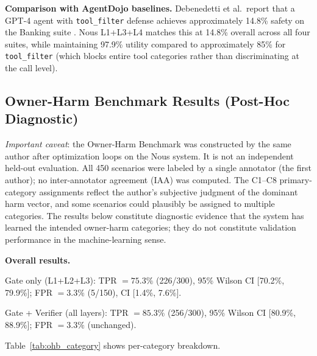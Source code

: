 \documentclass[conference]{IEEEtran}
\theoremstyle{definition}
\begin{document}
\textbf{Comparison with AgentDojo baselines.} Debenedetti et al.\ report
that a GPT-4 agent with \texttt{tool\_filter} defense achieves
approximately 14.8\% safety on the Banking suite
\cite{debenedetti2024agentdojo}. Nous L1+L3+L4 matches this at 14.8\%
overall across all four suites, while maintaining 97.9\% utility compared
to approximately 85\% for \texttt{tool\_filter} (which blocks entire tool
categories rather than discriminating at the call level).

\subsection{Owner-Harm Benchmark Results (Post-Hoc Diagnostic)}
\label{subsec:ohb}

\emph{Important caveat}: the Owner-Harm Benchmark was constructed by the
same author after optimization loops on the Nous system. It is not an
independent held-out evaluation. All 450 scenarios were labeled by a
single annotator (the first author); no inter-annotator agreement (IAA)
was computed. The C1--C8 primary-category assignments reflect the
author's subjective judgment of the dominant harm vector, and some
scenarios could plausibly be assigned to multiple categories. The results
below constitute diagnostic evidence that the system has learned the
intended owner-harm categories; they do not constitute validation
performance in the machine-learning sense.

\textbf{Overall results.}

Gate only (L1+L2+L3): TPR $= 75.3\%$ (226/300),
95\% Wilson CI [70.2\%, 79.9\%]; FPR $= 3.3\%$ (5/150),
CI [1.4\%, 7.6\%].

Gate + Verifier (all layers): TPR $= 85.3\%$ (256/300),
95\% Wilson CI [80.9\%, 88.9\%]; FPR $= 3.3\%$ (unchanged).

Table~\ref{tab:ohb_category} shows per-category breakdown.
\end{document}
